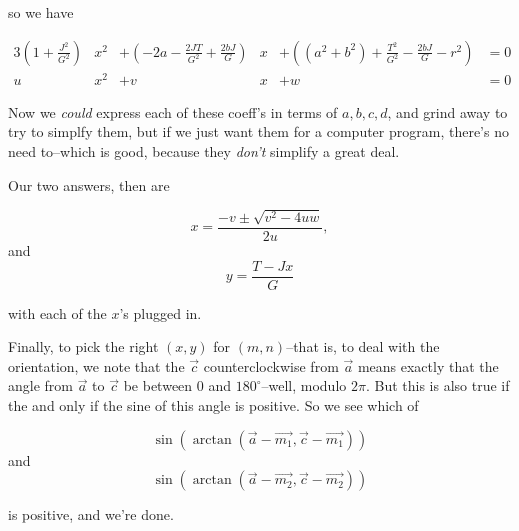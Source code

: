 \documentclass[12pt]{article}
\begin{document}
so we have

\begin{alignat}{3}
\left(1+\frac{J^2}{G^2}\right)&x^2 & 
	+\left(-2a-\frac{2JT}{G^2}+\frac{2bJ}{G}\right)&x &
	+\left((a^2+b^2)+\frac{T^2}{G^2}-\frac{2bJ}{G}-r^2\right)& = 0\\
u&x^2 &+ v&x &+ w& = 0
\end{alignat}


Now we {\em could} express each of these coeff's in terms of $a,b,c,d$,
and grind away to try to simplfy them, but if we just want them for a
computer program, there's no need to--which is good, because they {\em
don't} simplify a great deal.

Our {\rm two} answers, then are

\begin{equation}
x = \frac{-v\pm\sqrt{v^2-4uw}}{2u},
\end{equation}
and
\begin{equation}
y = \frac{T-Jx}{G}
\end{equation}

with each of the $x$'s plugged in.

Finally, to pick the right $(x,y)$ for $(m,n)$--that is, to deal with
the orientation, we note that the $\vec{c}$ counterclockwise from
$\vec{a}$ means exactly that the angle from $\vec{a}$ to $\vec{c}$ be
between $0$ and ${180}^\circ$--well, modulo $2\pi$.  But this is also true
if the and only if the sine of this angle is positive.  So we see which
of

\begin{equation}
\sin(\arctan(\vec{a}-\vec{m_1},\vec{c}-\vec{m_1}))
\end{equation}
and
\begin{equation}
\sin(\arctan(\vec{a}-\vec{m_2},\vec{c}-\vec{m_2}))
\end{equation}

is positive, and we're done.
\end{document}
